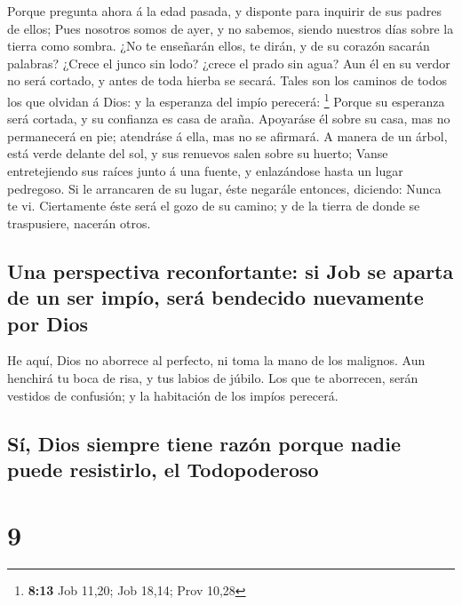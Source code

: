  Porque pregunta ahora á la edad pasada, y disponte para
inquirir de sus padres de ellos;  Pues nosotros somos de
ayer, y no sabemos, siendo nuestros días sobre la tierra como sombra.
 ¿No te enseñarán ellos, te dirán, y de su corazón sacarán
palabras?  ¿Crece el junco sin lodo? ¿crece el prado sin
agua?  Aun él en su verdor no será cortado, y antes de toda
hierba se secará.  Tales son los caminos de todos los que
olvidan á Dios: y la esperanza del impío perecerá: \footnote{\textbf{8:13}
  Job 11,20; Job 18,14; Prov 10,28}  Porque su esperanza
será cortada, y su confianza es casa de araña.  Apoyaráse
él sobre su casa, mas no permanecerá en pie; atendráse á ella, mas no se
afirmará.  A manera de un árbol, está verde delante del
sol, y sus renuevos salen sobre su huerto;  Vanse
entretejiendo sus raíces junto á una fuente, y enlazándose hasta un
lugar pedregoso.  Si le arrancaren de su lugar, éste
negarále entonces, diciendo: Nunca te vi.  Ciertamente éste
será el gozo de su camino; y de la tierra de donde se traspusiere,
nacerán otros.

\hypertarget{una-perspectiva-reconfortante-si-job-se-aparta-de-un-ser-impuxedo-seruxe1-bendecido-nuevamente-por-dios}{%
\subsection{Una perspectiva reconfortante: si Job se aparta de un ser
impío, será bendecido nuevamente por
Dios}\label{una-perspectiva-reconfortante-si-job-se-aparta-de-un-ser-impuxedo-seruxe1-bendecido-nuevamente-por-dios}}

 He aquí, Dios no aborrece al perfecto, ni toma la mano de
los malignos.  Aun henchirá tu boca de risa, y tus labios
de júbilo.  Los que te aborrecen, serán vestidos de
confusión; y la habitación de los impíos perecerá.

\hypertarget{suxed-dios-siempre-tiene-razuxf3n-porque-nadie-puede-resistirlo-el-todopoderoso}{%
\subsection{Sí, Dios siempre tiene razón porque nadie puede resistirlo,
el
Todopoderoso}\label{suxed-dios-siempre-tiene-razuxf3n-porque-nadie-puede-resistirlo-el-todopoderoso}}

\hypertarget{section-8}{%
\section{9}\label{section-8}}

